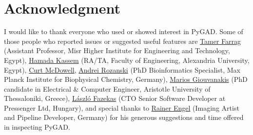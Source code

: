 \documentclass[conference]{IEEEtran}
\begin{document}





\section*{Acknowledgment}

I would like to thank everyone who used or showed interest in PyGAD. Some of those people who reported issues or suggested useful features are \href{https://github.com/tfarrag2000}{Tamer Farrag} (Assistant Professor, Misr Higher Institute for Engineering and Technology, Egypt), \href{https://www.linkedin.com/in/hamadakassem}{Hamada Kassem} (RA/TA, Faculty of Engineering, Alexandria University, Egypt), \underline{Curt McDowell},  \href{https://www.mpibpc.mpg.de/17254711/andrei-rozanski}{Andrei Rozanski} (PhD Bioinformatics Specialist, Max Planck Institute for Biophysical Chemistry, Germany), \href{https://www.researchgate.net/profile/Marios-Giouvanakis}{Marios Giouvanakis} (PhD candidate in Electrical \& Computer Engineer, Aristotle University of Thessaloniki, Greece), \href{https://www.linkedin.com/in/l\%C3\%A1szl\%C3\%B3-fazekas-2429a912}{László Fazekas} (CTO Senior Software Developer at Pressenger Ltd, Hungary), and special thanks to \href{https://www.linkedin.com/in/rainer-matthias-engel-5ba47a9}{Rainer Engel} (Imaging Artist and Pipeline Developer, Germany) for his generous suggestions and time offered in inspecting PyGAD. 


\end{document}
